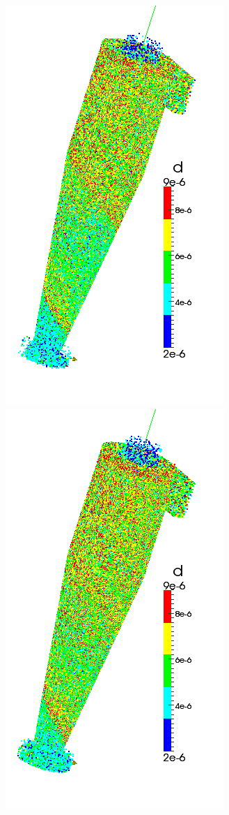 \begin{figure}[h]
\begin{minipage}{0.2\linewidth}
	\end{minipage}
		\hspace{-1em}
	\begin{minipage}{0.2\linewidth}
		\includegraphics[scale=0.3]{t4}
	\end{minipage}
		\hspace{-1em}
	\begin{minipage}{0.2\linewidth}
		\includegraphics[scale=0.3]{t5}

\end{minipage}
\end{figure}
